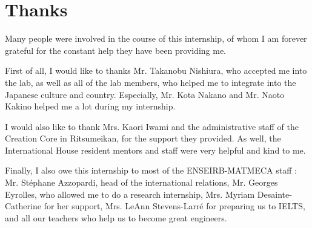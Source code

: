\section*{Thanks}
Many people were involved in the course of this internship, of whom I am forever grateful for the constant help they have been providing me.

First of all, I would like to thanks Mr. Takanobu Nishiura, who accepted me into the lab, as well as all of the lab members, who helped me to integrate into the Japanese culture and country. Especially, Mr. Kota Nakano and Mr. Naoto Kakino helped me a lot during my internship.

I would also like to thank Mrs. Kaori Iwami and the administrative staff of the Creation Core in Ritsumeikan, for the support they provided. As well, the International House resident mentors and staff were very helpful and kind to me.

Finally, I also owe this internship to most of the ENSEIRB-MATMECA staff : Mr. Stéphane Azzopardi, head of the international relations, Mr. Georges Eyrolles, who allowed me to do a research internship, Mrs. Myriam Desainte-Catherine for her support, Mrs. LeAnn Stevens-Larré for preparing us to IELTS,  and all our teachers who help us to become great engineers.